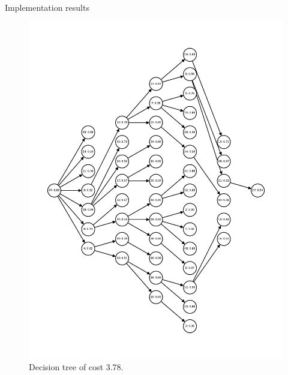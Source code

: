 \begin{frame}[allowframebreaks]{Implementation results}
\begin{figure}[htp]
{\begin{minipage}[t]{0.49\textwidth}
            \includegraphics[width=\textwidth]{figures/computed/dt_50.pdf}
            \caption{Decision tree of cost 3.78.}
        \end{minipage}
        }
    \end{figure}


\end{frame}
